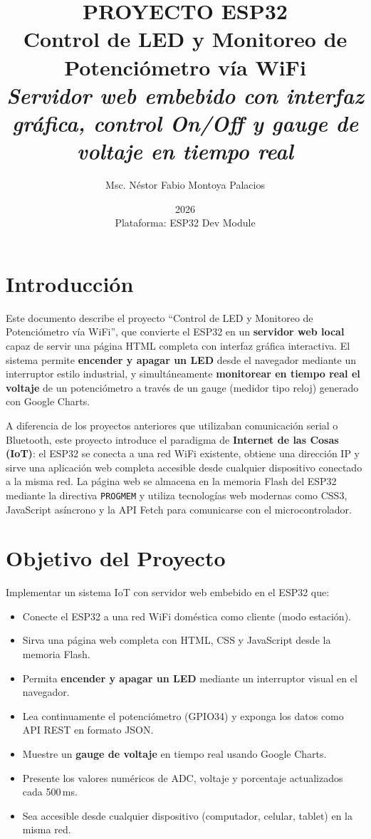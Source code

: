 \documentclass[12pt,a4paper]{article}
\title{\Huge\textbf{PROYECTO ESP32} \\ \Large Control de LED y Monitoreo de Potenciómetro vía WiFi \\ \vspace{0.5cm} \normalsize \textit{Servidor web embebido con interfaz gráfica, control On/Off y gauge de voltaje en tiempo real}}
\author{Msc. Néstor Fabio Montoya Palacios}
\date{2026 \\ \vspace{0.2cm} \small Plataforma: ESP32 Dev Module}
\begin{document}
\maketitle
\tableofcontents
\newpage

\section{Introducción}

Este documento describe el proyecto ``Control de LED y Monitoreo de Potenciómetro vía WiFi'', que convierte el ESP32 en un \textbf{servidor web local} capaz de servir una página HTML completa con interfaz gráfica interactiva. El sistema permite \textbf{encender y apagar un LED} desde el navegador mediante un interruptor estilo industrial, y simultáneamente \textbf{monitorear en tiempo real el voltaje} de un potenciómetro a través de un gauge (medidor tipo reloj) generado con Google Charts.

A diferencia de los proyectos anteriores que utilizaban comunicación serial o Bluetooth, este proyecto introduce el paradigma de \textbf{Internet de las Cosas (IoT)}: el ESP32 se conecta a una red WiFi existente, obtiene una dirección IP y sirve una aplicación web completa accesible desde cualquier dispositivo conectado a la misma red. La página web se almacena en la memoria Flash del ESP32 mediante la directiva \texttt{PROGMEM} y utiliza tecnologías web modernas como CSS3, JavaScript asíncrono y la API Fetch para comunicarse con el microcontrolador.

\section{Objetivo del Proyecto}

Implementar un sistema IoT con servidor web embebido en el ESP32 que:
\begin{itemize}
    \item Conecte el ESP32 a una red WiFi doméstica como cliente (modo estación).
    \item Sirva una página web completa con HTML, CSS y JavaScript desde la memoria Flash.
    \item Permita \textbf{encender y apagar un LED} mediante un interruptor visual en el navegador.
    \item Lea continuamente el potenciómetro (GPIO34) y exponga los datos como API REST en formato JSON.
    \item Muestre un \textbf{gauge de voltaje} en tiempo real usando Google Charts.
    \item Presente los valores numéricos de ADC, voltaje y porcentaje actualizados cada 500\,ms.
    \item Sea accesible desde cualquier dispositivo (computador, celular, tablet) en la misma red.
\end{itemize}
\end{document}
